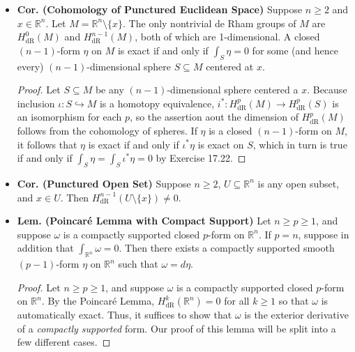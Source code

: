 \documentclass{article}
\newcommand{\embedd}{\hookrightarrow}
\begin{document}
	\begin{itemize}
		\item \textbf{Cor. (Cohomology of Punctured Euclidean Space)} Suppose $n\geq 2$ and $x \in \mathbb{R}^{n}$. Let $M = \mathbb{R}^{n}\setminus \{x\}$. The only nontrivial de Rham groups of $M$ are $H^{0}_{\text{dR}}(M)$ and $H^{n-1}_{\text{dR}}(M)$, both of which are 1-dimensional. A closed $(n-1)$-form $\eta$ on $M$ is exact if and only if $\int_{S}\eta = 0$ for some (and hence every) $(n-1)$-dimensional sphere $S \subseteq M$ centered at $x$. \vspace{-0.25cm}
		\begin{proof}
			Let $S \subseteq M$ be any $(n-1)$-dimensional sphere centered a $x$. Because inclusion $\iota: S \embedd M$ is a homotopy equivalence, $i^{\ast}: H^{p}_{\text{dR}}(M) \to H^{p}_{\text{dR}}(S)$ is an isomorphism for each $p$, so the assertion aout the dimension of $H^{p}_{\text{dR}}(M)$ follows from the cohomology of spheres. If $\eta$ is a closed $(n-1)$-form on $M$, it follows that $\eta$ is exact if and only if $\iota^{\ast}\eta$ is exact on $S$, which in turn is true if and only if $\int_{S}\eta = \int_{S}\iota^{\ast}\eta = 0$ by Exercise 17.22. 
		\end{proof}
		
		\item \textbf{Cor. (Punctured Open Set)} Suppose $n\geq 2$, $U \subseteq \mathbb{R}^{n}$ is any open subset, and $x \in U$. Then $H^{n-1}_{\text{dR}}(U\setminus \{x\}) \neq 0$. 
		
		\item \textbf{Lem. (Poincar\'e Lemma with Compact Support)} Let $n\geq p \geq 1$, and suppose $\omega$ is a compactly supported closed $p$-form on $\mathbb{R}^{n}$. If $p = n$, suppose in addition that $\int_{\mathbb{R}^{n}}\omega =0$. Then there exists a compactly supported smooth $(p-1)$-form $\eta$ on $\mathbb{R}^{n}$ such that $\omega = d\eta$. \vspace{-0.25cm}
		\begin{proof}
			Let $n\geq p\geq 1$, and suppose $\omega$ is a compactly supported closed $p$-form on $\mathbb{R}^{n}$. By the Poincar\'e Lemma, $H^{k}_{\text{dR}}(\mathbb{R}^{n}) = 0$ for all $k \geq 1$ so that $\omega$ is automatically exact. Thus, it suffices to show that $\omega$ is the exterior derivative of a \textit{compactly supported} form. Our proof of this lemma will be split into a few different cases. 
			

\end{proof}
\end{itemize}
\end{document}
